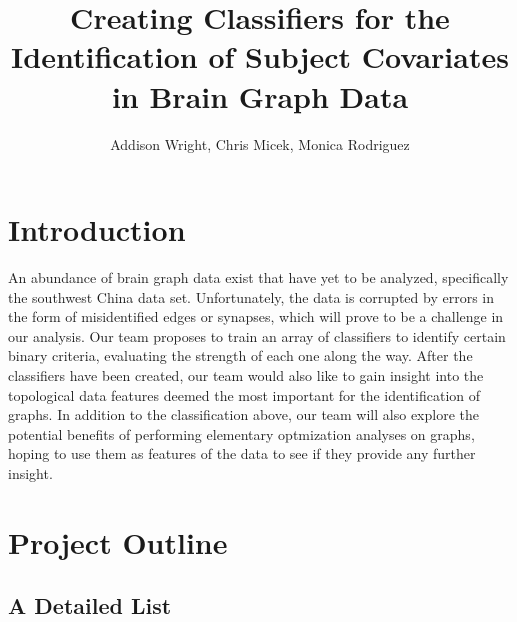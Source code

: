 \documentclass[11pt]{article} %
\title{Creating Classifiers for the Identification of Subject Covariates in Brain Graph Data}
\author{Addison Wright, Chris Micek, Monica Rodriguez}
\begin{document}
\maketitle
\section{Introduction}

An abundance of brain graph data exist that have yet to be analyzed, specifically the southwest China data set. Unfortunately, the data is corrupted by errors in the form of misidentified edges or synapses, which will prove to be a challenge in our analysis. Our team proposes to train an array of classifiers to identify certain binary criteria, evaluating the strength of each one along the way. After the classifiers have been created, our team would also like to gain insight into the topological data features deemed the most important for the identification of graphs. In addition to the classification above, our team will also explore the potential benefits of performing elementary optmization analyses on graphs, hoping to use them as features of the data to see if they provide any further insight.

\section{Project Outline}
\subsection{A Detailed List}
\end{document}
